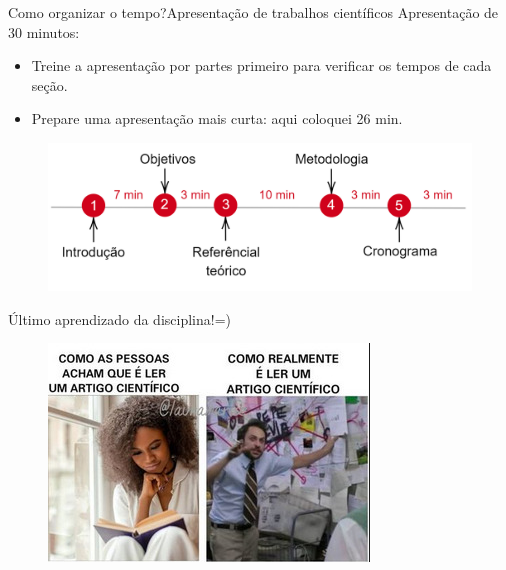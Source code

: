 \documentclass[t]{beamer}
\begin{document}
\begin{ftst}{Como organizar o tempo?}{Apresentação de trabalhos científicos}
Apresentação de 30 minutos:
\begin{itemize}
    \item Treine a apresentação por partes primeiro para verificar os tempos de cada seção.
    \item Prepare uma apresentação mais curta: aqui coloquei 26 min.
\end{itemize}
\vone

\begin{figure}
    \centering
    \includegraphics[scale=0.2]{Figuras/tempo.png}
\end{figure}
\end{ftst}


\begin{ftst}{\LARGE Último aprendizado da disciplina!}{=)}


\begin{figure}
    \centering
    \includegraphics[scale=0.8]{Figuras/meme.jpeg}
\end{figure}
\end{ftst}
\end{document}
